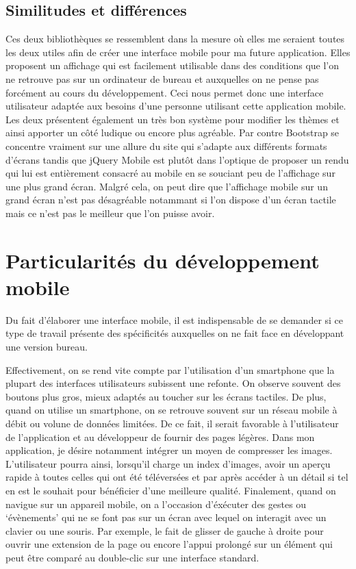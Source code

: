 \documentclass[a4paper,11pt,oneside]{sphinxmanual}
\begin{document}
\section{Similitudes et différences}
\label{Diff_xe9rence_jQM_boot:similitudes-et-differences}
Ces deux bibliothèques se ressemblent dans la mesure où elles me seraient toutes
les deux utiles afin de créer une interface mobile pour ma future application.
Elles proposent un affichage qui est facilement utilisable dans des conditions
que l'on ne retrouve pas sur un ordinateur de bureau et auxquelles on ne pense pas
forcément au cours du développement. Ceci nous permet donc une interface utilisateur
adaptée aux besoins d'une personne utilisant cette application mobile. Les deux
présentent également un très bon système pour modifier les thèmes et ainsi
apporter un côté ludique ou encore plus agréable.
Par contre Bootstrap se concentre vraiment sur une allure du site qui s'adapte
aux différents formats d'écrans tandis que jQuery Mobile est plutôt dans l'optique
de proposer un rendu qui lui est entièrement consacré au mobile en se souciant peu
de l'affichage sur une plus grand écran. Malgré cela, on peut dire que l'affichage
mobile sur un grand écran n'est pas désagréable notammant si l'on dispose d'un écran
tactile mais ce n'est pas le meilleur que l'on puisse avoir.


\chapter{Particularités du développement mobile}
\label{Particularit_xe9s::doc}\label{Particularit_xe9s:particularites-du-developpement-mobile}
Du fait d'élaborer une interface mobile, il est indispensable  de se demander
si ce type de travail présente des spécificités auxquelles on ne fait face en
développant une version bureau.

Effectivement, on se rend vite compte par l'utilisation d'un smartphone que la
plupart des interfaces utilisateurs subissent une refonte. On observe souvent
des boutons plus gros, mieux adaptés au toucher sur les écrans tactiles.
De plus, quand on utilise un smartphone, on se retrouve souvent sur un réseau
mobile à débit ou volune de données limitées. De ce fait, il serait favorable à
l'utilisateur de l'application et au développeur de fournir des pages légères.
Dans mon application, je désire notamment intégrer un moyen de compresser les
images. L'utilisateur pourra ainsi, lorsqu'il charge un index d'images, avoir
un aperçu rapide à toutes celles qui ont été téléversées et par après accéder
à un détail si tel en est le souhait pour bénéficier d'une meilleure qualité.
Finalement, quand on navigue sur un appareil mobile, on a l'occasion d'éxécuter
des gestes ou `évènements' qui ne se font pas sur un écran avec lequel on interagit
avec un clavier ou une souris. Par exemple, le fait de glisser de gauche à droite
pour ouvrir une extension de la page ou encore l'appui prolongé sur un élément
qui peut être comparé au double-clic sur une interface standard.
\end{document}

